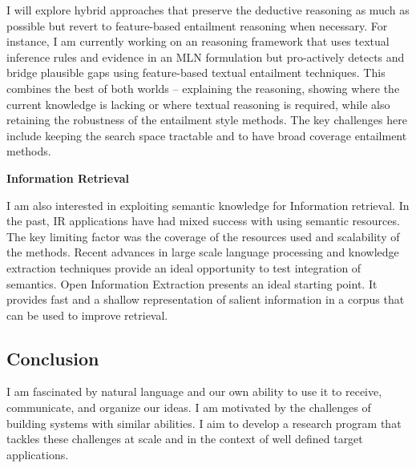 \documentclass[a4paper,11pt,onecolumn]{article}
\begin{document}
I will explore hybrid approaches that preserve the deductive reasoning as much as possible but revert to feature-based entailment reasoning when necessary. For instance, I am currently working on an reasoning framework that uses textual inference rules and evidence in an MLN formulation but pro-actively detects and bridge plausible gaps using feature-based textual entailment techniques. This combines the best of both worlds -- explaining the reasoning, showing where the current knowledge is lacking or where textual reasoning is required, while also retaining the robustness of the entailment style methods. The key challenges here include keeping the search space tractable and to have broad coverage entailment methods. 


{\bf Information Retrieval}

I am also interested in exploiting semantic knowledge for Information retrieval. In the past, IR applications have had mixed success with using semantic resources. The key limiting factor was the coverage of the resources used and scalability of the methods. Recent advances in large scale language processing and knowledge extraction techniques provide an ideal opportunity to test integration of semantics. Open Information Extraction presents an ideal starting point. It provides fast and a shallow representation of salient information in a corpus that can be used to improve retrieval. 

\subsection*{Conclusion}
I am fascinated by natural language and our own ability to use it to receive, communicate, and organize our ideas. I am motivated by the challenges of building systems with similar abilities. I aim to develop a research program that tackles these challenges at scale and in the context of well defined target applications. 

{\small


}
\end{document}
